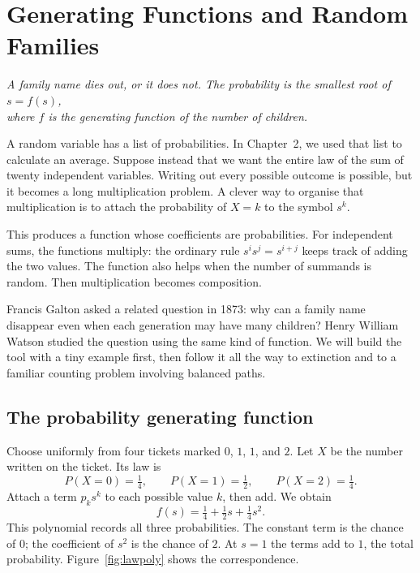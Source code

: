 \chapter{Generating Functions and Random Families}

\begin{center}\itshape
A family name dies out, or it does not. The probability is the smallest root of $s=f(s)$,\\
where $f$ is the generating function of the number of children.
\end{center}

A random variable has a list of probabilities. In Chapter~2, we used that list to calculate an average. Suppose instead that we want the entire law of the sum of twenty independent variables. Writing out every possible outcome is possible, but it becomes a long multiplication problem. A clever way to organise that multiplication is to attach the probability of $X=k$ to the symbol $s^k$.

This produces a function whose coefficients are probabilities. For independent sums, the functions multiply: the ordinary rule $s^i s^j=s^{i+j}$ keeps track of adding the two values. The function also helps when the number of summands is random. Then multiplication becomes composition.

Francis Galton asked a related question in 1873: why can a family name disappear even when each generation may have many children? Henry William Watson studied the question using the same kind of function. We will build the tool with a tiny example first, then follow it all the way to extinction and to a familiar counting problem involving balanced paths.

\section{The probability generating function}

Choose uniformly from four tickets marked $0$, $1$, $1$, and $2$. Let $X$ be the number written on the ticket. Its law is
\[
 P(X=0)=\tfrac14,\qquad P(X=1)=\tfrac12,\qquad P(X=2)=\tfrac14.
\]
Attach a term $p_k s^k$ to each possible value $k$, then add. We obtain
\[
 f(s)=\tfrac14+\tfrac12s+\tfrac14s^2.
\]
This polynomial records all three probabilities. The constant term is the chance of $0$; the coefficient of $s^2$ is the chance of $2$. At $s=1$ the terms add to $1$, the total probability. Figure~\ref{fig:lawpoly} shows the correspondence.


